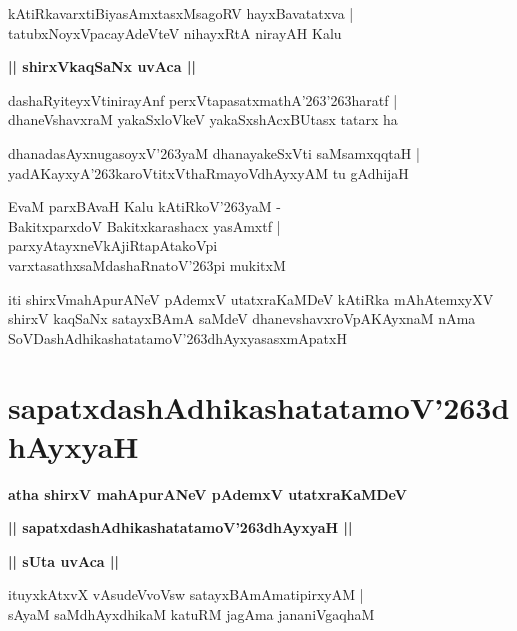 \documentclass[twoside,12pt,openright]{book}
\def\S{\char'263}
\newcounter{shloka}[chapter]
\def\uvaca#1{\centerline{{\large\textbf{#1}}}}
\begin{document}
\begin{shloka}%
kAtiRkavarxtiBiyasAmxtasxMsagoRV hayxBavatatxva |\\
tatubxNoyxVpacayAdeVteV nihayxRtA nirayAH Kalu
\end{shloka}

\uvaca{|| shirxVkaqSaNx uvAca ||}

\begin{shloka}%
dashaRyiteyxVtinirayAnf perxVtapasatxmathA\S \S haratf |\\
dhaneVshavxraM yakaSxloVkeV yakaSxshAcxBUtasx tatarx ha
\end{shloka}

\begin{shloka}%
dhanadasAyxnugasoyxV\S yaM dhanayakeSxVti saMsamxqqtaH |\\
yadAKayxyA\S karoVtitxVthaRmayoVdhAyxyAM tu gAdhijaH 
\end{shloka}

\begin{shloka}%
EvaM parxBAvaH Kalu kAtiRkoV\S yaM -\\
BakitxparxdoV Bakitxkarashacx yasAmxtf |\\
parxyAtayxneVkAjiRtapAtakoVpi \\
varxtasathxsaMdashaRnatoV\S pi mukitxM 
\end{shloka}

\begin{center}
iti shirxVmahApurANeV pAdemxV utatxraKaMDeV kAtiRka mAhAtemxyXV shirxV kaqSaNx satayxBAmA saMdeV 
dhanevshavxroVpAKAyxnaM nAma SoVDashAdhikashatatamoV\S dhAyxyasasxmApatxH 
\end{center}

\chapter{sapatxdashAdhikashatatamoV\S dhAyxyaH}

\begin{center}
{\LARGE\bfseries atha shirxV mahApurANeV pAdemxV utatxraKaMDeV}
\end{center}

\begin{center}
{\LARGE\bfseries || sapatxdashAdhikashatatamoV\S dhAyxyaH || }
\end{center}

\uvaca{|| sUta uvAca ||}

\begin{shloka}%
ituyxkAtxvX vAsudeVvoVsw satayxBAmAmatipirxyAM |\\
sAyaM saMdhAyxdhikaM katuRM jagAma jananiVgaqhaM 
\end{shloka}
\end{document}
